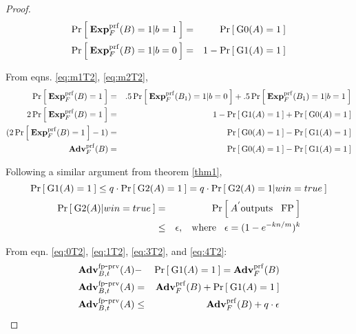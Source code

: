 \begin{proof}
\begin{eqnarray}
\Prob{\ExpPRF{F}{B} = 1|b=1} &=& \Prob{\game{0}(A)=1}\label{eq:m1T2}\\
\Prob{\ExpPRF{F}{B} = 1|b=0} &=& 1-\Prob{\game{1}(A)=1}\label{eq:m2T2}
\end{eqnarray}

From eqns. \ref{eq:m1T2}, \ref{eq:m2T2},
\begin{eqnarray}
\nonumber \Prob{\ExpPRF{F}{B} = 1} &=& .5\Prob{\ExpPRF{F}{B_1}=1|b=0} + .5\Prob{\ExpPRF{F}{B_1} = 1|b=1}\\
\nonumber 2\Prob{\ExpPRF{F}{B} = 1} &=& 1-\Prob{\game{1}(A)=1} + \Prob{\game{0}(A)=1}\\
\nonumber (2\Prob{\ExpPRF{F}{B} = 1} - 1)  &=& \Prob{\game{0}(A)=1} - \Prob{\game{1}(A)=1}\\
 \AdvPRF{F}{B} &=& \Prob{\game{0}(A)=1} - \Prob{\game{1}(A)=1} \label{eq:1T2}
\end{eqnarray}

Following a similar argument from theorem \ref{thm1},
\begin{equation}
\Prob{\game{1}(A)=1} \leq q \cdot \Prob{\game{2}(A)=1} = q \cdot \Prob{\game{2}(A)=1|win=true}\label{eq:3T2}
\end{equation}
\begin{eqnarray}
\nonumber \Prob{\game{2}(A)|win=true} &=& \Prob{A^{'} \mathrm{outputs \nudge FP}}\\
& \leq & \epsilon, \nudge \mathrm{where} \nudge \epsilon = (1-e^{-kn/m})^k\label{eq:4T2}
\end{eqnarray}

From eqn. \ref{eq:0T2}, \ref{eq:1T2}, \ref{eq:3T2},  and \ref{eq:4T2}: \\
\begin{eqnarray}
\nonumber \AdvFPSecHash{B,t}{A} &-& \Prob{\game{1}(A)=1} =  \AdvPRF{F}{B}   \\
\nonumber \AdvFPSecHash{B,t}{A}  &=&  \AdvPRF{F}{B} + \Prob{\game{1}(A)=1}  \\
\AdvFPSecHash{B,t}{A} &\leq&  \AdvPRF{F}{B}  + q \cdot \epsilon
\end{eqnarray}


\end{proof}

